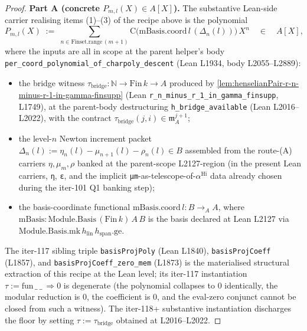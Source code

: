 \begin{proof}
\textbf{Part A (concrete $P_{m,l}(X) \in A[X]$).} The substantive
Lean-side carrier realising items (1)--(3) of the recipe above is
the polynomial
\[
P_{m,l}(X) \;:=\;
\sum_{n \in \mathrm{Finset.range}\,(m + 1)}
   \mathrm{C}\bigl(\mathrm{mBasis.coord}\,l \,(\Delta_n(l))\bigr)\,X^n
\quad\in\quad A[X],
\]
where the inputs are all in scope at the parent helper's body
\texttt{per\_coord\_polynomial\_of\_charpoly\_descent} (Lean
L1934, body L2055--L2889):
\begin{itemize}
\item the bridge witness $\tau_{\mathrm{bridge}} : \mathbb N \to
\mathrm{Fin}\,k \to A$ produced by
\cref{lem:henselianPair-r-n-minus-r-1-in-gamma-finsupp}
(Lean \texttt{r\_n\_minus\_r\_1\_in\_gamma\_finsupp}, L1749), at
the parent-body destructuring \texttt{h\_bridge\_available}
(Lean L2016--L2022), with the contract $\tau_{\mathrm{bridge}}(j,
i) \in \mathfrak m_A^{j + 1}$;
\item the level-$n$ Newton increment packet $\Delta_n(l) :=
\eta_n(l) - \mu_{n + 1}(l) - \rho_n(l) \in B$ assembled from the
route-(A) carriers $\eta, \mu_m, \rho$ banked at the parent-scope
L2127-region (in the present Lean carriers,
\texttt{η}, \texttt{ε}, and the implicit
\texttt{μm}-as-telescope-of-$\alpha^{\mathrm{Hi}}$ data already
chosen during the iter-101 Q1 banking step);
\item the basis-coordinate functional $\mathrm{mBasis.coord}\,l :
B \to_A A$, where $\mathrm{mBasis} : \mathrm{Module.Basis}\,(\mathrm{Fin}\,k)\,A\,B$
is the basis declared at Lean L2127 via
$\mathrm{Module.Basis.mk}\,h_{\mathrm{lin}}\,h_{\mathrm{span}}.\mathrm{ge}$.
\end{itemize}
The iter-117 sibling triple \texttt{basisProjPoly} (Lean L1840),
\texttt{basisProjCoeff} (L1857), and
\texttt{basisProjCoeff\_zero\_mem} (L1873) is the materialised
structural extraction of this recipe at the Lean level; its
iter-117 instantiation $\tau := \mathrm{fun}\,\_\ \_\ \Rightarrow
0$ is degenerate (the polynomial collapses to $0$ identically,
the modular reduction is $0$, the coefficient is $0$, and the
eval-zero conjunct cannot be closed from such a witness). The
iter-118+ substantive instantiation discharges the floor by
setting $\tau := \tau_{\mathrm{bridge}}$ obtained at L2016--L2022.


\end{proof}
